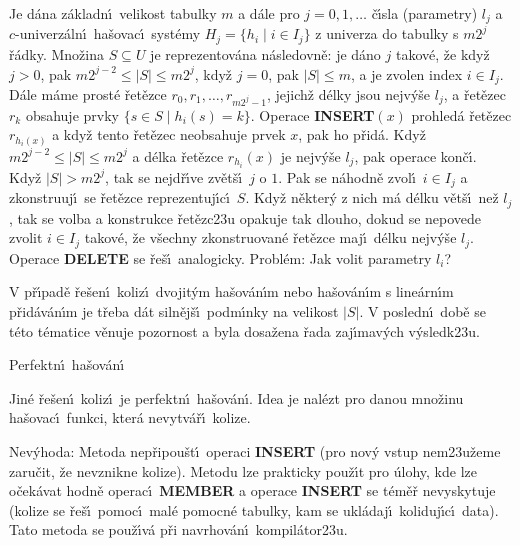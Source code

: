 \flushpar Je d\'ana z\'akladn\'\i\ velikost tabulky $m$ a d\'ale pro $
j=0,1,\dots$ 
\v c\'\i sla (parametry) $l_j$ a $c$-univer\-z\'al\-n\'\i\ ha\v sovac\'\i\ syst\'emy 
$H_j=\{h_i\mid i\in I_j\}$ z univerza do tabulky s $m2^j$ \v r\'adky.\newline 
Mno\v zina $S\subseteq U$ je reprezentov\'ana n\'asledovn\v e:  je d\'ano $
j$ 
tako\-v\'e, \v ze kdy\v z $j>0$, pak $m2^{j-2}\le |S|\le m2^j$, kdy\v z $
j=0$, pak 
$|S|\le m$, a je zvolen index $i\in I_j$.  D\'ale m\'ame prost\'e \v ret\v ezce 
$r_0,r_1,\dots,r_{m2^j-1}$, jejich\v z d\'elky jsou nejv\'y\v se $
l_j$, a \v ret\v ezec $r_k$ 
obsahuje prvky $\{s\in S\mid h_i(s)=k\}$.\newline 
Operace {\bf INSERT$(x)$} prohled\'a \v ret\v ezec $r_{h_i(x)}$ a kdy\v z tento 
\v re\-t\v e\-zec neobsahuje prvek $x$, pak ho p\v rid\'a.  Kdy\v z 
$m2^{j-2}\le |S|\le m2^j$ a d\'elka \v ret\v ezce $r_{h_i}(x)$ je nejv\'y\v se $
l_j$, pak 
operace kon\v c\'\i .  Kdy\v z $|S|>m2^j$, tak se nejd\v r\'\i ve zv\v et\v s\'\i\ $
j$ o $1$.  
Pak se n\'ahodn\v e zvol\'\i\ $i\in I_j$ a zkonstruuj\'\i\ se \v ret\v ezce 
reprezentuj\'\i c\'\i\ $S$.  Kdy\v z n\v ekter\'y z nich m\'a d\'elku v\v et\v s\'\i\ ne\v z $
l_j$, 
tak se volba a konstrukce \v ret\v ezc\accent23u opakuje tak dlouho, 
dokud se nepovede zvolit $i\in I_j$ takov\'e, \v ze v\v sechny 
zkonstruovan\'e \v ret\v ezce maj\'\i\ d\'elku nejv\'y\v se $l_j$.  Operace {\bf DELETE }
se \v re\v s\'\i\ analogicky.\newline 
Probl\'em:  Jak volit parametry $l_i$?  
\medskip


\flushpar V p\v r\'\i pad\v e \v re\v sen\'\i\ 
koliz\'\i\ dvojit\'ym ha\v sov\'an\'\i m nebo ha\v sov\'an\'\i m s 
line\'arn\'\i m p\v rid\'av\'an\'\i m je t\v reba d\'at siln\v ej\v s\'\i\ podm\'\i nky na velikost $|S|$. V posledn\'\i\ dob\v e se t\'eto t\'ematice 
v\v enuje pozornost a byla dosa\v zena \v rada zaj\'\i mav\'ych v\'ysledk\accent23u.

\heading
Perfektn\'\i\ ha\v sov\'an\'\i
\endheading

\flushpar Jin\'e \v re\v sen\'\i\ koliz\'\i\ je perfektn\'\i\ ha\v sov\'an\'\i . Idea 
je nal\'ezt pro danou mno\v zinu ha\v sovac\'\i\ funkci, kter\'a 
nevytv\'a\v r\'\i\ kolize.
\medskip

\flushpar Nev\'yhoda: Metoda nep\v ripou\v st\'\i\ operaci {\bf INSERT }
(pro nov\'y vstup nem\accent23u\v zeme zaru\v cit, \v ze nevznikne  
kolize). Metodu lze prakticky pou\v z\'\i t pro \'ulohy, kde lze 
o\v cek\'avat hodn\v e operac\'\i\ {\bf MEMBER} a operace {\bf INSERT} se 
t\'em\v e\v r nevyskytuje (kolize se \v re\v s\'\i\ pomoc\'\i\ mal\'e pomocn\'e 
tabulky, kam se ukl\'adaj\'\i\ koliduj\'\i\-c\'\i\ data). Tato metoda se 
pou\v z\'\i v\'a p\v ri navrhov\'an\'\i\ kompil\'ator\accent23u.
\medskip

